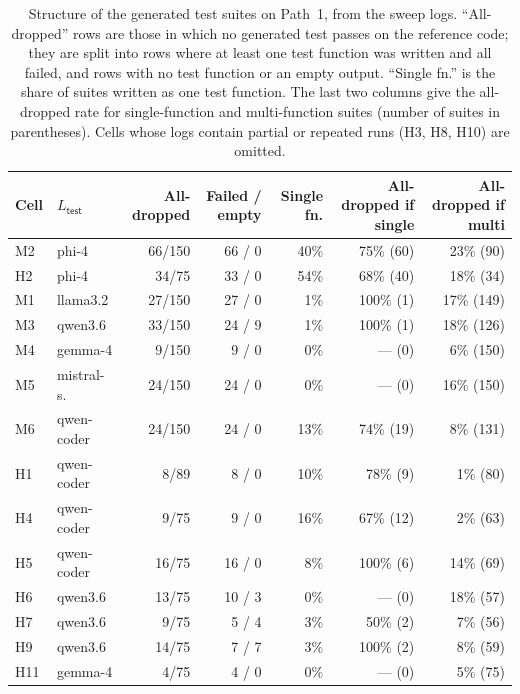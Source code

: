 \begin{table}[!htbp]
  \centering
  \small
  \caption{Structure of the generated test suites on Path~1, from the sweep
    logs. ``All-dropped'' rows are those in which no generated test passes
    on the reference code; they are split into rows where at least one test
    function was written and all failed, and rows with no test function or
    an empty output. ``Single fn.'' is the share of suites written as one
    test function. The last two columns give the all-dropped rate for
    single-function and multi-function suites (number of suites in
    parentheses). Cells whose logs contain partial or repeated runs (H3,
    H8, H10) are omitted.}
  \label{tab:test_suite_structure}
  \begin{tabular}{@{}llrrrrr@{}}
    \toprule
    Cell & $L_{\textsf{test}}$ & All-dropped & Failed / empty & Single fn. & All-dropped if single & All-dropped if multi \\
    \midrule
    M2 & phi-4 & 66/150 & 66 / 0 & 40\% & 75\% (60) & 23\% (90) \\
    H2 & phi-4 & 34/75 & 33 / 0 & 54\% & 68\% (40) & 18\% (34) \\
    \midrule
    M1 & llama3.2 & 27/150 & 27 / 0 & 1\% & 100\% (1) & 17\% (149) \\
    M3 & qwen3.6 & 33/150 & 24 / 9 & 1\% & 100\% (1) & 18\% (126) \\
    M4 & gemma-4 & 9/150 & 9 / 0 & 0\% & --- (0) & 6\% (150) \\
    M5 & mistral-s. & 24/150 & 24 / 0 & 0\% & --- (0) & 16\% (150) \\
    M6 & qwen-coder & 24/150 & 24 / 0 & 13\% & 74\% (19) & 8\% (131) \\
    H1 & qwen-coder & 8/89 & 8 / 0 & 10\% & 78\% (9) & 1\% (80) \\
    H4 & qwen-coder & 9/75 & 9 / 0 & 16\% & 67\% (12) & 2\% (63) \\
    H5 & qwen-coder & 16/75 & 16 / 0 & 8\% & 100\% (6) & 14\% (69) \\
    H6 & qwen3.6 & 13/75 & 10 / 3 & 0\% & --- (0) & 18\% (57) \\
    H7 & qwen3.6 & 9/75 & 5 / 4 & 3\% & 50\% (2) & 7\% (56) \\
    H9 & qwen3.6 & 14/75 & 7 / 7 & 3\% & 100\% (2) & 8\% (59) \\
    H11 & gemma-4 & 4/75 & 4 / 0 & 0\% & --- (0) & 5\% (75) \\
    \bottomrule
  \end{tabular}
\end{table}
